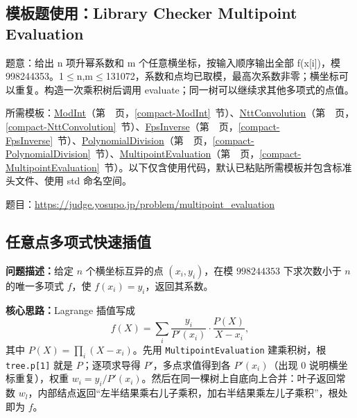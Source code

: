 

\Needspace{435pt}

\subsection*{模板题使用：Library Checker Multipoint Evaluation}

\label{usage-example-211}

题意：给出 n 项升幂系数和 m 个任意横坐标，按输入顺序输出全部 f(x[i])，模 998244353。1$\le$n,m$\le$131072，系数和点均已取模，最高次系数非零；横坐标可以重复。构造一次乘积树后调用 evaluate；同一树可以继续求其他多项式的点值。

所需模板：\hyperref[compact-ModInt]{ModInt}（第~\pageref{compact-ModInt}~页，\ref{compact-ModInt}~节）、\hyperref[compact-NttConvolution]{NttConvolution}（第~\pageref{compact-NttConvolution}~页，\ref{compact-NttConvolution}~节）、\hyperref[compact-FpsInverse]{FpsInverse}（第~\pageref{compact-FpsInverse}~页，\ref{compact-FpsInverse}~节）、\hyperref[compact-PolynomialDivision]{PolynomialDivision}（第~\pageref{compact-PolynomialDivision}~页，\ref{compact-PolynomialDivision}~节）、\hyperref[compact-MultipointEvaluation]{MultipointEvaluation}（第~\pageref{compact-MultipointEvaluation}~页，\ref{compact-MultipointEvaluation}~节）。以下仅含使用代码，默认已粘贴所需模板并包含标准头文件、使用 std 命名空间。

题目：\url{https://judge.yosupo.jp/problem/multipoint_evaluation}



\Needspace{555pt}

\subsection{任意点多项式快速插值}\label{compact-polynomial_interpolation}

\noindent\textbf{问题描述：}\allowbreak 给定 $n$ 个横坐标互异的点 $(x_i,y_i)$，在模 $998244353$ 下求次数小于 $n$ 的唯一多项式 $f$，使 $f(x_i)=y_i$，返回其系数。

\textbf{核心思路：}\allowbreak Lagrange 插值写成 \[f(X)=\sum_i\frac{y_i}{P'(x_i)}\cdot\frac{P(X)}{X-x_i},\] 其中 $P(X)=\prod_i(X-x_i)$。先用 \texttt{MultipointEvaluation} 建乘积树，根 \texttt{tree.p[1]} 就是 $P$；逐项求导得 $P'$，多点求值得到各 $P'(x_i)$（出现 0 说明横坐标重复），权重 $w_i=y_i/P'(x_i)$。然后在同一棵树上自底向上合并：叶子返回常数 $w_l$，内部结点返回“左半结果乘右儿子乘积，加右半结果乘左儿子乘积”，根处即为 $f$。

